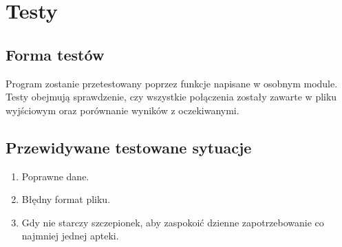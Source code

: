 \documentclass[a4paper,12pt,twoside]{article}
\begin{document}
\section{Testy}
\subsection{Forma testów}
Program zostanie przetestowany poprzez funkcje napisane w osobnym module. Testy obejmują sprawdzenie, czy wszystkie połączenia zostały zawarte w pliku wyjściowym oraz porównanie wyników z oczekiwanymi.
\subsection{Przewidywane testowane sytuacje}
\begin{enumerate}
\item Poprawne dane.
\item Błędny format pliku.
\item Gdy nie starczy szczepionek, aby zaspokoić dzienne zapotrzebowanie co najmniej jednej apteki.
\end{enumerate}
\end{document}
